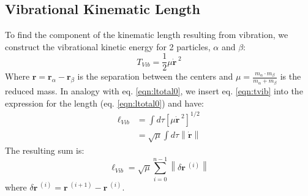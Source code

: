 \documentclass[letterpaper,12pt]{article}
\renewcommand{\vec}[1]{\mathbf{#1}}
\newcommand{\norm}[1]{\left\lVert#1\right\rVert}
\renewcommand{\refeq}[1]{eq. \ref{eqn:#1}}
\begin{document}
\subsection{Vibrational Kinematic Length}
To find the component of the kinematic length resulting from vibration, we construct the vibrational kinetic energy for 2 particles, $\alpha$ and $\beta$:
\begin{equation}\label{eqn:tvib}
T_{Vib} = \frac{1}{2} \mu \dot{\vec{r}}^{\;2}
\end{equation}
Where $\vec{r} = \vec{r}_{\alpha} - \vec{r}_{\beta}$ is the separation between the centers and $\mu = \frac{m_{\alpha} \cdot m_{\beta}}{m_{\alpha}+m_{\beta}}$ is the reduced mass. In analogy with \refeq{ltotal0}, we insert \refeq{tvib} into the expression for the length (\refeq{ltotal0}) and have:
\begin{align}\label{eqn:lvib}
\ell_{Vib} &= \int d\tau \left[\mu \dot{\vec{r}}^{\;2}\right]^{1/2} \\
&= \sqrt{\mu} \int d\tau  \norm{\dot{\vec{r}}}
\end{align}
The resulting sum is:
\begin{equation}
\ell_{Vib} = \sqrt{\mu} \sum_{i=0}^{n-1}  \norm{\delta\vec{r}^{\;(i)}}
\end{equation}
where  $\delta \vec{r}^{\;(i)} = \vec{r}^{\;(i+1)} - \vec{r}^{\;(i)}$.
\end{document}
